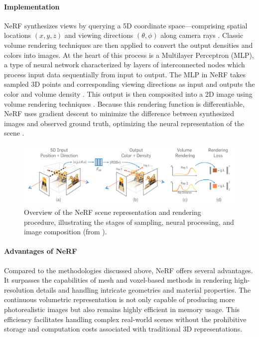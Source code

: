 \paragraph{Implementation}
NeRF synthesizes views by querying a 5D coordinate space—comprising spatial locations \((x, y, z)\) and viewing directions \((\theta, \phi)\) along camera rays .
Classic volume rendering techniques are then applied to convert the output densities and colors into images.
At the heart of this process is a Multilayer Perceptron (MLP), a type of neural network characterized by layers of interconnected nodes which process input data sequentially from input to output.
The MLP in NeRF takes sampled 3D points and corresponding viewing directions as input and outputs the color and volume density  .
This output is then composited into a 2D image using volume rendering techniques  .
Because this rendering function is differentiable, NeRF uses gradient descent to minimize the difference between synthesized images and observed ground truth, optimizing the neural representation of the scene  .

\begin{figure}[h!]
  \centering
  \includegraphics[width=\textwidth]{figures/bg-nerf.png}
  \caption{Overview of the NeRF scene representation and rendering procedure, illustrating the stages of sampling, neural processing, and image composition (from \cite{mildenhall_nerf_2021}).}
  \label{fig:nerf-overview}
\end{figure}

\paragraph{Advantages of NeRF}
Compared to the methodologies discussed above, NeRF offers several advantages.
It surpasses the capabilities of mesh and voxel-based methods in rendering high-resolution details and handling intricate geometries and material properties.
The continuous volumetric representation is not only capable of producing more photorealistic images but also remains highly efficient in memory usage.
This efficiency facilitates handling complex real-world scenes without the prohibitive storage and computation costs associated with traditional 3D representations.


